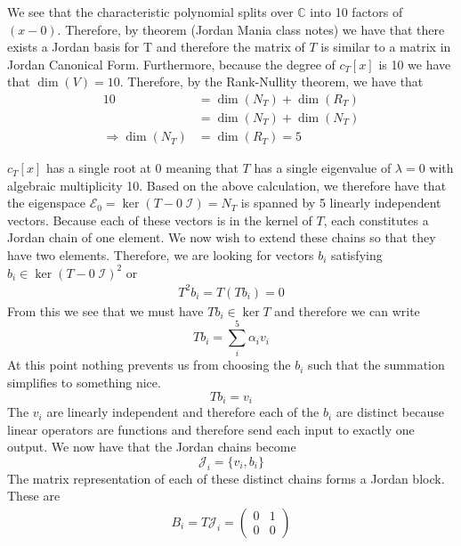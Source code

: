 \documentclass[a4paper, 11pt]{article}
\newcommand{\C}{\mathbb{C}}
\newenvironment{solution}{%
	\begin{list}{}{%
			\setlength{\topsep}{0pt}%
			\setlength{\leftmargin}{1.5cm}%
			\setlength{\rightmargin}{1.5cm}%
			\setlength{\listparindent}{\parindent}%
			\setlength{\itemindent}{\parindent}%
			\setlength{\parsep}{\parskip}%
		}%
		\item[]}{\end{list}}
\begin{document}
\begin{solution}
  \noindent We see that the characteristic polynomial splits over $\C$ into 10 factors of $(x-0)$. Therefore, by theorem (Jordan Mania class notes) we have that there exists a Jordan basis for T and therefore the matrix of $T$ is similar to a matrix in Jordan Canonical Form. Furthermore, because the degree of $c_T[x]$ is 10 we have that $\dim(V)=10$. Therefore, by the Rank-Nullity theorem, we have that
  \begin{align*}
    10 &= \dim(N_T) + \dim(R_T) \\
    &= \dim(N_T) + \dim(N_T) \\
    \Rightarrow \dim(N_T) &= \dim(R_T) = 5
  \end{align*}

  \noindent $c_T[x]$ has a single root at 0 meaning that $T$ has a single eigenvalue of $\lambda=0$ with algebraic multiplicity 10. Based on the above calculation, we therefore have that the eigenspace $\mathcal{E}_0=\ker(T-0\;\mathcal{I}) = N_T$ is spanned by 5 linearly independent vectors. Because each of these vectors is in the kernel of $T$, each constitutes a Jordan chain of one element. We now wish to extend these chains so that they have two elements. Therefore, we are looking for vectors $b_i$ satisfying $b_i\in\ker(T-0\;\mathcal{I})^2$ or
  \begin{align*}
    T^2 b_i = T(Tb_i) = 0
  \end{align*}
  From this we see that we must have $Tb_i\in\ker{T}$ and therefore we can write 
  \begin{equation*}
    Tb_i = \sum_i^5 \alpha_i v_i
  \end{equation*}
  At this point nothing prevents us from choosing the $b_i$ such that the summation simplifies to something nice. 
  \begin{equation*}
    Tb_i = v_i
  \end{equation*}
  The $v_i$ are linearly independent and therefore each of the $b_i$ are distinct because linear operators are functions and therefore send each input to exactly one output. We now have that the Jordan chains become
  \begin{equation*}
    \mathcal{J}_i = \{ v_i, b_i\}
  \end{equation*}
  The matrix representation of each of these distinct chains forms a Jordan block. These are
  \begin{align*}
    B_i = T\mathcal{J}_i = \begin{pmatrix} 0 & 1 \\ 0 & 0 \end{pmatrix}

\end{align*}
\end{solution}
\end{document}
